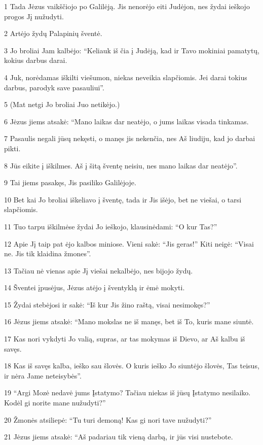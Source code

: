 \par 1 Tada Jėzus vaikščiojo po Galilėją. Jis nenorėjo eiti Judėjon, nes žydai ieškojo progos Jį nužudyti. 
\par 2 Artėjo žydų Palapinių šventė. 
\par 3 Jo broliai Jam kalbėjo: “Keliauk iš čia į Judėją, kad ir Tavo mokiniai pamatytų, kokius darbus darai. 
\par 4 Juk, norėdamas iškilti viešumon, niekas neveikia slapčiomis. Jei darai tokius darbus, parodyk save pasauliui”. 
\par 5 (Mat netgi Jo broliai Juo netikėjo.) 
\par 6 Jėzus jiems atsakė: “Mano laikas dar neatėjo, o jums laikas visada tinkamas. 
\par 7 Pasaulis negali jūsų nekęsti, o manęs jis nekenčia, nes Aš liudiju, kad jo darbai pikti. 
\par 8 Jūs eikite į iškilmes. Aš į šitą šventę neisiu, nes mano laikas dar neatėjo”. 
\par 9 Tai jiems pasakęs, Jis pasiliko Galilėjoje. 
\par 10 Bet kai Jo broliai iškeliavo į šventę, tada ir Jis išėjo, bet ne viešai, o tarsi slapčiomis. 
\par 11 Tuo tarpu iškilmėse žydai Jo ieškojo, klausinėdami: “O kur Tas?” 
\par 12 Apie Jį taip pat ėjo kalbos miniose. Vieni sakė: “Jis geras!” Kiti neigė: “Visai ne. Jis tik klaidina žmones”. 
\par 13 Tačiau nė vienas apie Jį viešai nekalbėjo, nes bijojo žydų. 
\par 14 Šventei įpusėjus, Jėzus atėjo į šventyklą ir ėmė mokyti. 
\par 15 Žydai stebėjosi ir sakė: “Iš kur Jis žino raštą, visai nesimokęs?” 
\par 16 Jėzus jiems atsakė: “Mano mokslas ne iš manęs, bet iš To, kuris mane siuntė. 
\par 17 Kas nori vykdyti Jo valią, supras, ar tas mokymas iš Dievo, ar Aš kalbu iš savęs. 
\par 18 Kas iš savęs kalba, ieško sau šlovės. O kuris ieško Jo siuntėjo šlovės, Tas teisus, ir nėra Jame neteisybės”. 
\par 19 “Argi Mozė nedavė jums Įstatymo? Tačiau niekas iš jūsų Įstatymo nesilaiko. Kodėl gi norite mane nužudyti?” 
\par 20 Žmonės atsiliepė: “Tu turi demoną! Kas gi nori tave nužudyti?” 
\par 21 Jėzus jiems atsakė: “Aš padariau tik vieną darbą, ir jūs visi nustebote. 
